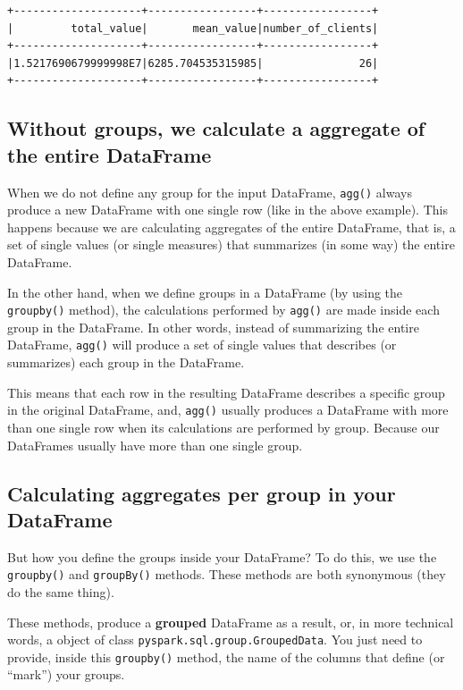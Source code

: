 \documentclass[
  11pt,
  letterpaper,
  DIV=11,
  numbers=noendperiod]{scrreprt}
\begin{document}
\begin{verbatim}
+--------------------+-----------------+-----------------+
|         total_value|       mean_value|number_of_clients|
+--------------------+-----------------+-----------------+
|1.5217690679999998E7|6285.704535315985|               26|
+--------------------+-----------------+-----------------+
\end{verbatim}

\subsection{Without groups, we calculate a aggregate of the entire
DataFrame}\label{without-groups-we-calculate-a-aggregate-of-the-entire-dataframe}

When we do not define any group for the input DataFrame, \texttt{agg()}
always produce a new DataFrame with one single row (like in the above
example). This happens because we are calculating aggregates of the
entire DataFrame, that is, a set of single values (or single measures)
that summarizes (in some way) the entire DataFrame.

In the other hand, when we define groups in a DataFrame (by using the
\texttt{groupby()} method), the calculations performed by \texttt{agg()}
are made inside each group in the DataFrame. In other words, instead of
summarizing the entire DataFrame, \texttt{agg()} will produce a set of
single values that describes (or summarizes) each group in the
DataFrame.

This means that each row in the resulting DataFrame describes a specific
group in the original DataFrame, and, \texttt{agg()} usually produces a
DataFrame with more than one single row when its calculations are
performed by group. Because our DataFrames usually have more than one
single group.

\subsection{Calculating aggregates per group in your
DataFrame}\label{sec-group-by}

But how you define the groups inside your DataFrame? To do this, we use
the \texttt{groupby()} and \texttt{groupBy()} methods. These methods are
both synonymous (they do the same thing).

These methods, produce a \textbf{grouped} DataFrame as a result, or, in
more technical words, a object of class
\texttt{pyspark.sql.group.GroupedData}. You just need to provide, inside
this \texttt{groupby()} method, the name of the columns that define (or
``mark'') your groups.
\end{document}
